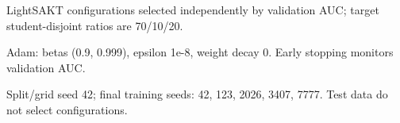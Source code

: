 \begin{table}[htbp]
\centering
\setcounter{table}{2}
\caption{Training network configurations for different datasets}
\begin{minipage}{\textwidth}\footnotesize
LightSAKT configurations selected independently by validation AUC; target student-disjoint ratios are 70/10/20.\par Adam: betas (0.9, 0.999), epsilon 1e-8, weight decay 0. Early stopping monitors validation AUC.\par Split/grid seed 42; final training seeds: 42, 123, 2026, 3407, 7777. Test data do not select configurations.
\end{minipage}
\end{table}
